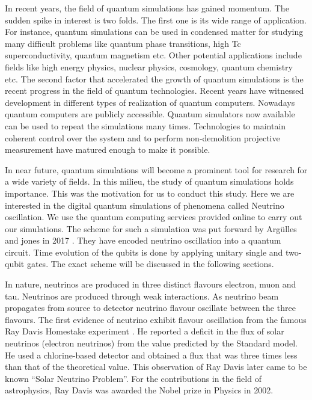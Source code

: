 In recent years, the field of quantum simulations has gained momentum. The sudden spike in interest is two folds. The first one is its wide range of application. For instance, quantum simulations can be used in condensed matter for studying many difficult problems like quantum phase transitions, high Tc superconductivity, quantum magnetism etc. Other potential applications include fields like high energy physics, nuclear physics, cosmology, quantum chemistry etc. The second factor that accelerated the growth of quantum simulations is the recent progress in the field of quantum technologies. Recent years have witnessed development in different types of realization of quantum computers. Nowadays quantum computers are publicly accessible. Quantum simulators now available can be used to repeat the simulations many times. Technologies to maintain coherent control over the system and to perform non-demolition projective measurement have matured enough to make it possible.

In near future, quantum simulations will become a prominent tool for research for a wide variety of fields. In this milieu, the study of quantum simulations holds importance. This was the motivation for us to conduct this study. Here we are interested in the digital quantum simulations of phenomena called Neutrino oscillation. We use the quantum computing services provided online to carry out our simulations. The scheme for such a simulation was put forward by Arg\"ulles and jones in 2017 \cite{jones}. They have encoded neutrino oscillation into a quantum circuit. Time evolution of the qubits is done by applying unitary single and two-qubit gates. The exact scheme will be discussed in the following sections. 

In nature, neutrinos are produced in three distinct flavours electron, muon and tau. Neutrinos are produced through weak interactions. As neutrino beam propagates from source to detector neutrino flavour oscillate between the three flavours. The first evidence of neutrino exhibit flavour oscillation from the famous Ray Davis Homestake experiment \cite{ray}.  He reported a deficit in the flux of solar neutrinos (electron neutrinos)  from the value predicted by the Standard model. He used a chlorine-based detector and obtained a flux that was three times less than that of the theoretical value.  This observation of Ray Davis later came to be known “Solar Neutrino Problem”. For the contributions in the field of astrophysics, Ray Davis was awarded the Nobel prize in Physics in 2002. 

